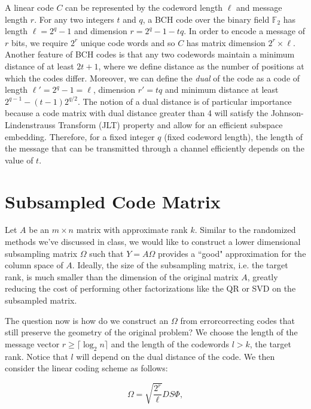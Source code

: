 \documentclass[12pt]{article}
\newcommand{\ti}{\textit}
\newcommand{\mB}{\mathbb}
\begin{document}
A linear code $C$ can be represented by the codeword length $\ell$ and message length $r$.  For any two integers $t$ and $q$, a BCH code over the binary field $\mB{F}_2$ has length $\ell = 2^q - 1$ and dimension $r = 2^q - 1 - tq$. In order to encode a message of $r$ bits, we require $2^r$ unique code words and so $C$ has matrix dimension $2^r \times \ell$. Another feature of BCH codes is that any two codewords maintain a minimum distance of at least $2t + 1$, where we define distance as the number of positions at which the codes differ. Moreover, we can define the \ti{dual} of the code as a code of length $\ell' = 2^q - 1 = \ell$, dimension $r' = tq$ and minimum distance at least $2^{q-1} - (t -1)2^{q/2}$. The notion of a dual distance is of particular importance because a code matrix with dual distance greater than 4 will satisfy the Johnson-Lindenstrauss Transform (JLT) property and allow for an efficient subspace embedding. Therefore, for a fixed integer $q$ (fixed codeword length), the length of the message that can be transmitted through a channel efficiently depends on the value of $t$.

\section{Subsampled Code Matrix}
Let $A$ be an $m \times n$ matrix with approximate rank $k$. Similar to the randomized methods we've discussed in class, we would like to construct a lower dimensional subsampling matrix  $\Omega$ such that $Y = A \Omega $ provides a ``good" approximation for the column space of $A$. Ideally, the size of the subsampling matrix, i.e. the target rank, is much smaller than the dimension of the original matrix $A$, greatly reducing the cost of performing other factorizations like the QR or SVD on the subsampled matrix.

\vspace{3mm}
The question now is how do we construct an $\Omega$ from errorcorrecting codes  that still preserve the geometry of the original problem? We choose the length of the message vector $r \ge \lceil{\log_2n\rceil}$ and the length of the codewords $l > k$, the target rank. Notice that $l$ will depend on the dual distance of the code. We then consider the linear coding scheme as follows: 

\[ \Omega = \sqrt{ \frac{ 2^r }{ \ell } } D S \Phi, \] 
\end{document}
